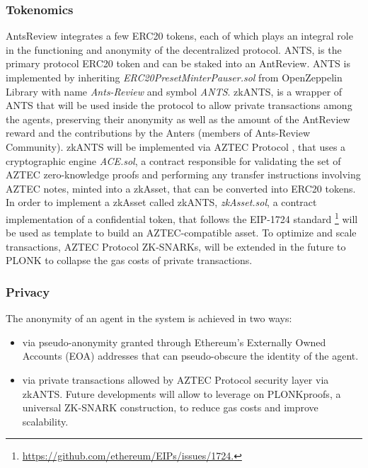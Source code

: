 \documentclass[runningheads]{llncs}
\begin{document}
\subsubsection{Tokenomics}
AntsReview integrates a few ERC20 tokens, each of which plays an integral role in the functioning and anonymity of the decentralized protocol.
\newline ANTS, is the primary protocol ERC20 token and can be staked into an AntReview.
\newline ANTS is implemented by inheriting \emph{ERC20PresetMinterPauser.sol} from OpenZeppelin Library with name \emph{Ants-Review} and symbol \emph{ANTS}.
\newline zkANTS, is a wrapper of ANTS that will be used inside the protocol to allow private transactions among the agents, preserving their anonymity as well as the amount of the AntReview reward and the contributions by the Anters (members of Ants-Review Community).
\newline zkANTS will be implemented via AZTEC Protocol \cite{AZTEC}, that uses a cryptographic engine \emph{ACE.sol}, a contract responsible for validating the set of AZTEC zero-knowledge proofs and performing any transfer instructions involving AZTEC notes, minted into a zkAsset, that can be converted into ERC20 tokens. In order to implement a zkAsset called zkANTS, \emph{zkAsset.sol}, a contract implementation of a confidential token, that follows the EIP-1724 standard \footnote[9]{\url{https://github.com/ethereum/EIPs/issues/1724.}} will be used as template to build an AZTEC-compatible asset.
\newline To optimize and scale transactions, AZTEC Protocol ZK-SNARKs, will be extended in the future to PLONK \cite{PLONK} to collapse the gas costs of private transactions.

\subsubsection{Privacy}
The anonymity of an agent in the system is achieved in two ways:

\begin{itemize}
  \item via pseudo-anonymity granted through Ethereum's Externally Owned Accounts (EOA) addresses that can pseudo-obscure the identity of the agent.
  \item via private transactions allowed by AZTEC Protocol security layer via zkANTS. Future developments will allow to leverage on PLONK\cite{PLONK}proofs, a universal ZK-SNARK construction, to reduce gas costs and improve scalability.
\end{itemize}
\end{document}
